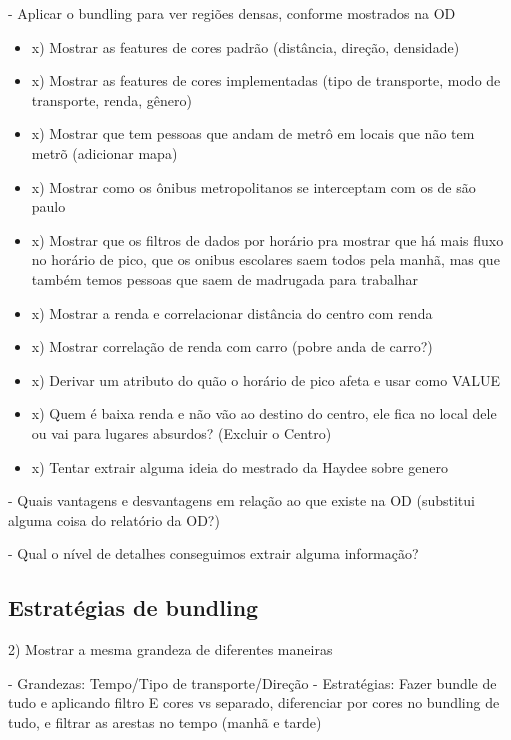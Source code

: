 - Aplicar o bundling para ver regiões densas, conforme mostrados na OD

  \begin{itemize}
    \item x) Mostrar as features de cores padrão (distância, direção, densidade)
    \item x) Mostrar as features de cores implementadas (tipo de transporte, modo de transporte, renda, gênero)
    \item x) Mostrar que tem pessoas que andam de metrô em locais que não tem metrõ (adicionar mapa)
    \item x) Mostrar como os ônibus metropolitanos se interceptam com os de são paulo
    \item x) Mostrar que os filtros de dados por horário pra mostrar que há mais fluxo
       no horário de pico, que os onibus escolares saem todos pela manhã, mas que também temos
      pessoas que saem de madrugada para trabalhar
    \item x) Mostrar a renda e correlacionar distância do centro com renda
    \item x) Mostrar correlação de renda com carro (pobre anda de carro?)
    \item x) Derivar um atributo do quão o horário de pico afeta e usar como VALUE

    \item x) Quem é baixa renda e não vão ao destino do centro, ele fica no local dele ou vai para lugares absurdos? (Excluir o Centro)
    \item x) Tentar extrair alguma ideia do mestrado da Haydee sobre genero
  \end{itemize}

	- Quais vantagens e desvantagens em relação ao que existe na OD (substitui alguma coisa do relatório da OD?)

	- Qual o nível de detalhes conseguimos extrair alguma informação?

  
\subsection{Estratégias de bundling}

2) Mostrar a mesma grandeza de diferentes maneiras

- Grandezas: Tempo/Tipo de transporte/Direção
- Estratégias: Fazer bundle de tudo e aplicando filtro E cores vs separado,
diferenciar por cores no bundling de tudo, e filtrar as arestas no tempo (manhã
e tarde)

